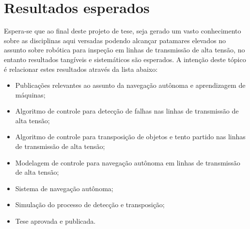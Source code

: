 \chapter{Resultados esperados}
Espera-se que ao final deste projeto de tese, seja gerado um vasto conhecimento sobre as disciplinas aqui versadas podendo alcançar patamares elevados no assunto sobre robótica para inspeção em linhas de transmissão de alta tensão, no entanto resultados tangíveis e sistemáticos são esperados.
A intenção deste tópico é relacionar estes resultados através da lista abaixo:

\begin{itemize}
\item Publicações relevantes ao assunto da navegação autônoma e aprendizagem de máquinas;
\item Algoritmo de controle para detecção de falhas nas linhas de transmissão de alta tensão;
\item Algoritmo de controle para transposição de objetos e tento partido nas linhas de transmissão de alta tensão;
\item Modelagem de controle para navegação autônoma em linhas de transmissão de alta tensão;
\item Sistema de navegação autônoma;
\item Simulação do processo de detecção e transposição;
\item Tese aprovada e publicada.
\end{itemize}















